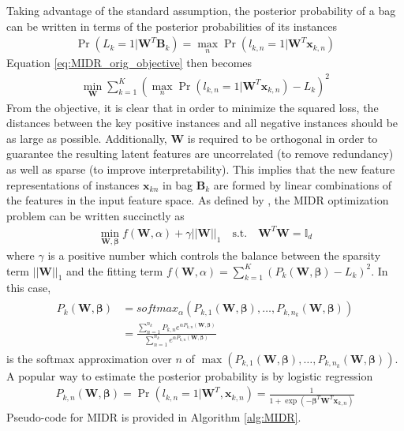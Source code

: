 \noindent
Taking advantage of the standard assumption, the posterior probability of a bag can be written in terms of the posterior probabilities of its instances
\begin{align}
	\Pr(L_{k}=1|\bm{W}^{T}\bm{B}_{k}) = \max_{n} \Pr(l_{k,n}=1|\bm{W}^{T}\bm{x}_{k,n}) 
\end{align}
Equation \ref{eq:MIDR_orig_objective} then becomes 
\begin{align}
	\min_{\bm{W}} \sum_{k=1}^{K} (\max_{n} \Pr(l_{k,n}=1|\bm{W}^{T}\bm{x}_{k,n}) - L_{k})^{2}
	\label{eq:MIDR_instance_objective}
\end{align}
\noindent
From the objective, it is clear that in order to minimize the squared loss, the distances between the key positive instances and all negative instances should be as large as possible. Additionally, $\bm{W}$ is required to be orthogonal in order to guarantee the resulting latent features are uncorrelated (to remove redundancy) as well as sparse (to improve interpretability).  This implies that the new feature representations of instances $\bm{x}_{kn}$ in bag $\bm{B}_{k}$ are formed by linear combinations of the features in the input feature space.  As defined by \cite{Zhu2018MIDRSparsity}, the MIDR optimization problem can be written succinctly as
\begin{align}
	\min_{\bm{W},\bm{\beta}} f(\bm{W},\alpha) + \gamma ||\bm{W} ||_{1}  \quad \text{s.t.} \quad \bm{W}^{T}\bm{W} = \mathbb{I}_{d}
	\label{eq:MIDR_objective}
\end{align}
\noindent
where $\gamma$ is a positive number which controls the balance between the sparsity term $||\bm{W}||_{1}$ and the fitting term $f(\bm{W},\alpha)=\sum_{k=1}^{K} (P_{k}(\bm{W},\bm{\beta}) - L_{k})^{2}$.  In this case, 
\begin{align}
	\begin{split}
	P_{k}(\bm{W},\bm{\beta}) &= softmax_{\alpha}(P_{k,1}(\bm{\bm{W}},\bm{\beta}), \dots, P_{k,n_{k}}(\bm{\bm{W}},\bm{\beta})) \\
	&= \frac{\sum_{n=1}^{n_{k}}P_{k,n}e^{\alpha P_{k,n}(\bm{W},\bm{\beta})}}{\sum_{n=1}^{n_{k}}e^{\alpha P_{k,n}(\bm{W},\bm{\beta})}}
	\end{split}
\end{align}
\noindent
is the softmax approximation over $n$ of $\max (P_{k,1}(\bm{\bm{W}},\bm{\beta}), \dots, P_{k,n_{k}}(\bm{\bm{W}},\bm{\beta}))$.  A popular way to estimate the posterior probability is by logistic regression
\begin{align}
	P_{k,n}(\bm{W},\bm{\beta}) = \Pr(l_{k,n}=1|\bm{W}^{T},\bm{x}_{k,n}) = \frac{1}{1+\exp(-\bm{\beta}^{T} \bm{W}^{T}\bm{x}_{k,n})}
\end{align}
\noindent
Pseudo-code for MIDR is provided in Algorithm \ref{alg:MIDR}.

